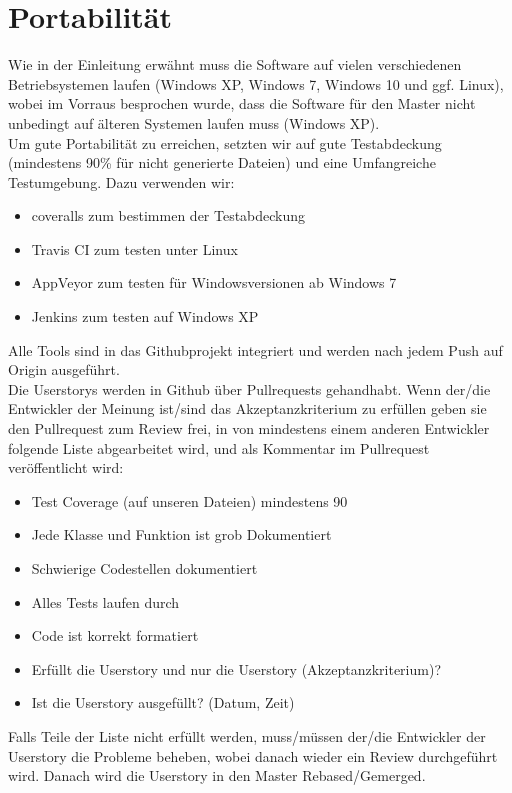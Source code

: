 \documentclass[accentcolor=tud9c,12pt,paper=a4]{tudreport}
\begin{document}
		\section{Portabilität}
			Wie in der Einleitung erwähnt muss die Software auf vielen verschiedenen 
			Betriebsystemen laufen (Windows XP, Windows 7, Windows 10 und ggf. Linux),
			wobei im Vorraus besprochen wurde, dass die Software für den Master nicht 
			unbedingt auf älteren Systemen laufen muss (Windows XP).
			\\[5pt]
			Um gute Portabilität zu erreichen, setzten wir auf gute Testabdeckung 
			(mindestens 90\% für nicht generierte Dateien) und eine Umfangreiche 
			Testumgebung. Dazu verwenden wir:
			\begin{itemize}	
				\item coveralls zum bestimmen der Testabdeckung
				\item Travis CI zum testen unter Linux
				\item AppVeyor zum testen für Windowsversionen ab Windows 7
				\item Jenkins zum testen auf Windows XP
			\end{itemize}
			Alle Tools sind in das Githubprojekt integriert und werden nach jedem Push auf 
			Origin ausgeführt.
			\\[5pt]
			Die Userstorys werden in Github über Pullrequests gehandhabt. Wenn der/die 
			Entwickler der Meinung ist/sind das Akzeptanzkriterium zu erfüllen geben sie 
			den Pullrequest zum Review frei, in von mindestens einem anderen Entwickler 
			folgende Liste abgearbeitet wird, und als Kommentar im Pullrequest 
			veröffentlicht wird:
			\begin{itemize}	
				\item Test Coverage (auf unseren Dateien) mindestens 90%
				\item Jede Klasse und Funktion ist grob Dokumentiert
				\item Schwierige Codestellen dokumentiert
				\item Alles Tests laufen durch
				\item Code ist korrekt formatiert
				\item  Erfüllt die Userstory und nur die Userstory (Akzeptanzkriterium)?
				\item Ist die Userstory ausgefüllt? (Datum, Zeit)
			\end{itemize}
			Falls Teile der Liste nicht erfüllt werden, muss/müssen der/die Entwickler 
			der Userstory die Probleme beheben, wobei danach wieder ein Review 
			durchgeführt wird. Danach wird die Userstory in den Master Rebased/Gemerged.
		
\end{document}
